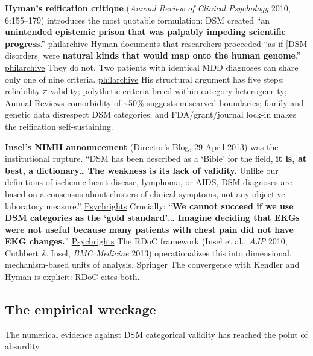 \textbf{Hyman's reification critique} (\emph{Annual Review of Clinical Psychology} 2010, 6:155--179) introduces the most quotable formulation: DSM created ``an \textbf{unintended epistemic prison that was palpably impeding scientific progress}.'' \href{https://philarchive.org/archive/HYMTDO-3}{philarchive} Hyman documents that researchers proceeded ``as if {[}DSM disorders{]} were \textbf{natural kinds that would map onto the human genome}.'' \href{https://philarchive.org/archive/HYMTDO-3}{philarchive} They do not. Two patients with identical MDD diagnoses can share only one of nine criteria. \href{https://philarchive.org/archive/HYMTDO-3}{philarchive} His structural argument has five steps: reliability ≠ validity; polythetic criteria breed within-category heterogeneity; \href{https://www.annualreviews.org/doi/pdf/10.1146/annurev.clinpsy.3.022806.091532}{Annual Reviews} comorbidity of \textasciitilde50\% suggests miscarved boundaries; family and genetic data disrespect DSM categories; and FDA/grant/journal lock-in makes the reification self-sustaining.

\textbf{Insel's NIMH announcement} (Director's Blog, 29 April 2013) was the institutional rupture. ``DSM has been described as a `Bible' for the field, \textbf{it is, at best, a dictionary}\ldots{} \textbf{The weakness is its lack of validity.} Unlike our definitions of ischemic heart disease, lymphoma, or AIDS, DSM diagnoses are based on a consensus about clusters of clinical symptoms, not any objective laboratory measure.'' \href{https://psychrights.org/2013/130429NIMHTransformingDiagnosis.htm}{Psychrights} Crucially: ``\textbf{We cannot succeed if we use DSM categories as the `gold standard'\ldots{} Imagine deciding that EKGs were not useful because many patients with chest pain did not have EKG changes.}'' \href{https://psychrights.org/2013/130429NIMHTransformingDiagnosis.htm}{Psychrights} The RDoC framework (Insel et al., \emph{AJP} 2010; Cuthbert \& Insel, \emph{BMC Medicine} 2013) operationalizes this into dimensional, mechanism-based units of analysis. \href{https://link.springer.com/article/10.1186/1741-7015-11-126}{Springer} The convergence with Kendler and Hyman is explicit: RDoC cites both.

\subsection{The empirical wreckage}\label{11_dsm_iii-the-empirical-wreckage}

The numerical evidence against DSM categorical validity has reached the point of absurdity.

